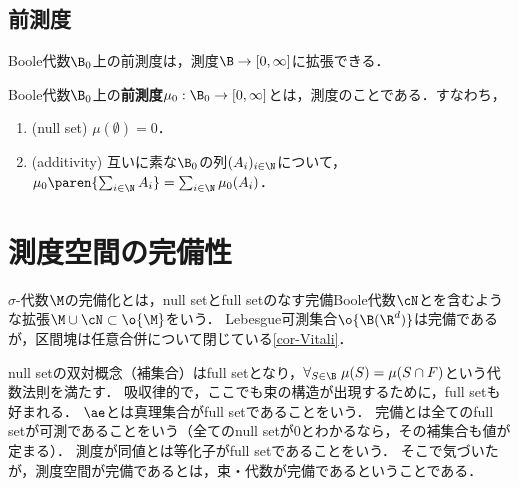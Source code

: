 \documentclass[uplatex, dvipdfmx]{jsreport}
\begin{document}
\subsection{前測度}

\begin{tcolorbox}[colframe=ForestGreen, colback=ForestGreen!10!white,breakable,colbacktitle=ForestGreen!40!white,coltitle=black,fonttitle=\bfseries\sffamily,
title=]
    Boole代数$\B_0$上の前測度は，測度$\B\to[0,\infty]$に拡張できる．
\end{tcolorbox}

\begin{definition}
    Boole代数$\B_0$上の\textbf{前測度}$\mu_0:\B_0\to[0,\infty]$とは，測度のことである．すなわち，
    \begin{enumerate}
        \item (null set) $\mu(\emptyset)=0$．
        \item (additivity) 互いに素な$\B_0$の列$(A_i)_{i\in\N}$について，$\mu_0\paren{\sum_{i\in\N}A_i}=\sum_{i\in\N}\mu_0(A_i)$．
    \end{enumerate}
\end{definition}

\section{測度空間の完備性}

\begin{tcolorbox}[colframe=ForestGreen, colback=ForestGreen!10!white,breakable,colbacktitle=ForestGreen!40!white,coltitle=black,fonttitle=\bfseries\sffamily,
title=]
    $\sigma$-代数$\M$の完備化とは，null setとfull setのなす完備Boole代数$\cN$とを含むような拡張$\M\cup\cN\subset\o{\M}$をいう．
    Lebesgue可測集合$\o{\B(\R^d)}$は完備であるが，区間塊は任意合併について閉じている\ref{cor-Vitali}．
\end{tcolorbox}

\begin{tcolorbox}[colframe=ForestGreen, colback=ForestGreen!10!white,breakable,colbacktitle=ForestGreen!40!white,coltitle=black,fonttitle=\bfseries\sffamily,
title=距離空間には完備化があるべき，測度空間にも完備化が標準的に取れるべき．これをあくまでも代数構造から抽出する．]
    null setの双対概念（補集合）はfull setとなり，$\forall_{S\in\B}\;\mu(S)=\mu(S\cap F)$という代数法則を満たす．
    吸収律的で，ここでも束の構造が出現するために，full setも好まれる．
    $\ae$とは真理集合がfull setであることをいう．
    完備とは全てのfull setが可測であることをいう（全てのnull setが$0$とわかるなら，その補集合も値が定まる）．
    測度が同値とは等化子がfull setであることをいう．
    そこで気づいたが，測度空間が完備であるとは，束・代数が完備であるということである．
\end{tcolorbox}
\end{document}
